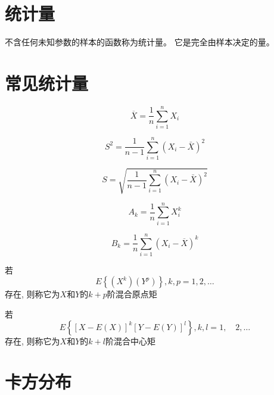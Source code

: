 \section{统计量}

不含任何未知参数的样本的函数称为统计量。
它是完全由样本决定的量。

\section{常见统计量}

\begin{definition}[样本平均值]
    $$\overline{X}=\frac{1}{n} \sum_{i=1}^{n} X_{i}$$
\end{definition}

\begin{definition}[样本方差]
    $$S^{2}=\frac{1}{ n-1} \sum_{i=1}^{n}\left(X_{i}-\bar{X}\right)^{2}$$
\end{definition}

\begin{definition}[样本标准差]
    $$S=\sqrt{\frac{1}{ { n-1} } \sum_{i=1}^{n}\left(X_{i}-\bar{X}\right)^{2}}$$
\end{definition}

\begin{definition}[样本 $k$ 阶原点矩]
    $$A_{k}=\frac{1}{n} \sum_{i=1}^{n} X_{i}^{k}$$
\end{definition}

\begin{definition}[样本 $k$ 阶中心矩]
    $${B}_{{k}}=\frac{1}{{n}} \sum_{i=1}^{n}\left({X}_{i}-\overline{{X}}\right)^{k}$$
\end{definition}

\begin{definition}[$X$和$Y$的$k+p$阶混合原点矩]
    若
    $$E \left\{\left(X^ k\right)\left(Y^ p\right)\right\}, k, p=1,2, \ldots $$
    存在, 则称它为$X$和$Y$的$k+p$阶混合原点矩
\end{definition}

\begin{definition}[$X$和$Y$的$k+l$阶混合中心矩]
    若
    $$ E\left\{[X-E(X)]^ k[Y-E(Y)]^l \right\},  k,l=1, \quad 2, \ldots $$
    存在, 则称它为$X$和$Y$的$k+l$阶混合中心矩
\end{definition}



\section{卡方分布}

